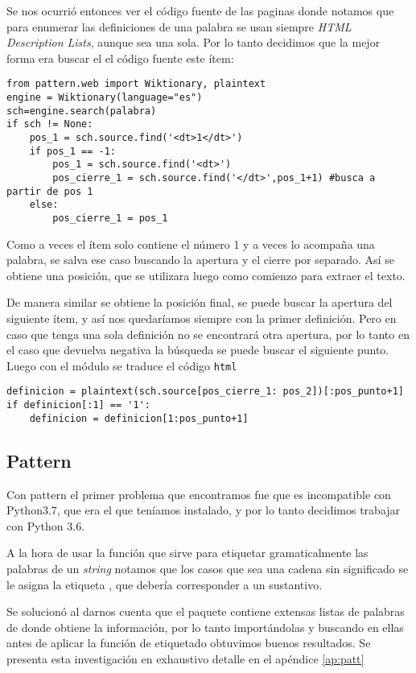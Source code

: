 Se nos ocurrió entonces ver el código fuente de las paginas donde notamos que para enumerar las definiciones de una palabra se usan siempre \emph{HTML Description Lists}, aunque sea una sola. Por lo tanto decidimos que la mejor forma era buscar el el código fuente este ítem:
\begin{verbatim}
from pattern.web import Wiktionary, plaintext
engine = Wiktionary(language="es")
sch=engine.search(palabra)
if sch != None:
	pos_1 = sch.source.find('<dt>1</dt>')
	if pos_1 == -1:
		pos_1 = sch.source.find('<dt>')
		pos_cierre_1 = sch.source.find('</dt>',pos_1+1) #busca a partir de pos 1
	else:
		pos_cierre_1 = pos_1
\end{verbatim}
Como a veces el ítem solo contiene el número 1 y a veces lo acompaña una palabra, se salva ese caso buscando la apertura  y el cierre  por separado.
Así se obtiene una posición, que se utilizara luego como comienzo para extraer el texto.

De manera similar se obtiene la posición final, se puede buscar la apertura del siguiente ítem, y así nos quedaríamos siempre con la primer definición. Pero en caso que tenga una sola definición no se encontrará otra apertura, por lo tanto en el caso que devuelva negativa la búsqueda se puede buscar el siguiente punto.
Luego con el módulo  se traduce el código \texttt{html}
\begin{verbatim}
definicion = plaintext(sch.source[pos_cierre_1: pos_2])[:pos_punto+1]
if definicion[:1] == '1':
	definicion = definicion[1:pos_punto+1]
\end{verbatim}

\subsection{Pattern}\label{patt}
Con pattern el primer problema que encontramos fue que es incompatible con Python3.7, que era el que teníamos instalado, y por lo tanto decidimos trabajar con Python 3.6.

A la hora de usar la función  que sirve para etiquetar gramaticalmente las palabras de un \emph{string} notamos que los casos que sea una cadena sin significado se le asigna la etiqueta , que debería corresponder a un sustantivo.

Se solucionó al darnos cuenta que el paquete contiene  extensas listas de palabras de donde obtiene la información, por lo tanto importándolas y buscando en ellas antes de aplicar la función de etiquetado obtuvimos buenos resultados. Se presenta esta investigación en exhaustivo detalle en el apéndice \ref{ap:patt}


